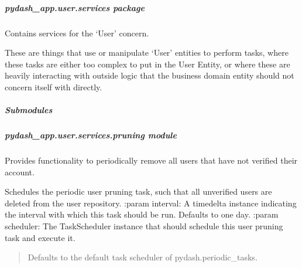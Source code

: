 \documentclass[letterpaper,10pt,english]{sphinxmanual}
\begin{document}
\subparagraph{pydash\_app.user.services package}
\label{\detokenize{pydash_app.user.services:module-pydash_app.user.services}}\label{\detokenize{pydash_app.user.services:pydash-app-user-services-package}}\label{\detokenize{pydash_app.user.services::doc}}
Contains services for the ‘User’ concern.

These are things that use or manipulate ‘User’ entities to perform tasks,
where these tasks are either too complex to put in the User Entity,
or where these are heavily interacting with outside logic that the business domain entity should not concern itself with directly.


\subparagraph{Submodules}
\label{\detokenize{pydash_app.user.services:submodules}}

\subparagraph{pydash\_app.user.services.pruning module}
\label{\detokenize{pydash_app.user.services.pruning:module-pydash_app.user.services.pruning}}\label{\detokenize{pydash_app.user.services.pruning:pydash-app-user-services-pruning-module}}\label{\detokenize{pydash_app.user.services.pruning::doc}}
Provides functionality to periodically remove all users that have not verified their account.

\begin{fulllineitems}
\label{\detokenize{pydash_app.user.services.pruning:pydash_app.user.services.pruning.schedule_periodic_pruning_task}}
Schedules the periodic user pruning task, such that all unverified users are deleted from the user repository.
:param interval: A timedelta instance indicating the interval with which this task should be run. Defaults to one day.
:param scheduler: The TaskScheduler instance that should schedule this user pruning task and execute it.
\begin{quote}

Defaults to the default task scheduler of pydash.periodic\_tasks.
\end{quote}

\end{fulllineitems}
\end{document}
